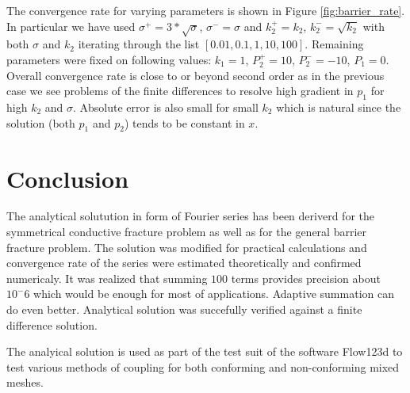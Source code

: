 \documentclass[a4paper,10pt]{article}
\begin{document}
The convergence rate for varying parameters is shown in Figure \ref{fig:barrier_rate}. In particular we have used $\sigma^+ = 3*\sqrt{\sigma}$, $\sigma^- = \sigma$
and $k_2^+ = k_2$, $k_2^- = \sqrt{k_2}$ with both $\sigma$ and $k_2$ iterating through the list $[0.01, 0.1, 1, 10, 100]$. Remaining parameters were fixed on 
following values: $k_1=1$, $P_2^+=10$, $P_2^-=-10$, $P_1=0$. Overall convergence rate is close to or beyond second order as in the previous case we see problems 
of the finite differences to resolve high gradient in $p_1$ for high $k_2$ and $\sigma$. Absolute error is also small for small $k_2$ which is natural since the 
solution (both $p_1$ and $p_2$) tends to be constant in $x$. 

\section{Conclusion}
\label{sec:conclusion}
The analytical solutution in form of Fourier series has been deriverd for the symmetrical conductive fracture problem as well as for 
the general barrier fracture problem. The solution was modified for practical calculations and convergence rate of the series were estimated theoretically and 
confirmed numericaly. It was realized that summing $100$ terms provides precision about $10^-6$ which would be enough for most of applications.
Adaptive summation can do even better. Analytical solution was succefully verified against a finite difference solution.  

The analyical solution is used as part of the test suit of the software Flow123d \cite{flow123d} to test various methods of coupling for both conforming 
and non-conforming mixed meshes.



  
 
\end{document}

